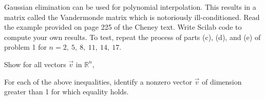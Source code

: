 \documentclass[addpoints, 11pt]{exam}
\newcommand{\ds}{\displaystyle}
\begin{document}
\begin{questions}
\question Gaussian elimination can be used for polynomial interpolation. This results in a matrix called the Vandermonde matrix which is notoriously ill-conditioned. Read the example provided on page 225 of the Cheney text. Write Scilab code to compute your own results. To test, repeat the process of parts (c), (d), and (e) of problem 1 for $n=2,~ 5,~ 8,~ 11,~ 14,~ 17$.

\question
{}

\pagebreak 

\question Show for all vectors $\vec{v}$ in $\mathbb{R}^n$,
For each of the above inequalities, identify a nonzero vector $\vec{v}$ of dimension greater than 1 for which equality holds.


\end{questions}
\end{document}
